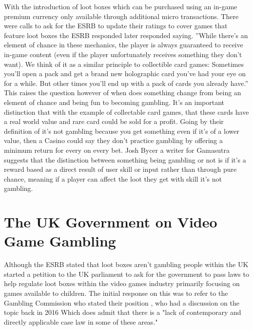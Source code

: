 \documentclass{scrartcl}
\begin{document}
With the introduction of loot boxes which can be purchased using an in-game premium currency only available through additional micro transactions. There were calls to ask for the ESRB to update their ratings to cover games that feature loot boxes the ESRB responded later responded saying. ''While there’s an element of chance in these mechanics, the player is always guaranteed to receive in-game content (even if the player unfortunately receives something they don’t want). We think of it as a similar principle to collectible card games: Sometimes you’ll open a pack and get a brand new holographic card you’ve had your eye on for a while. But other times you’ll end up with a pack of cards you already have.'' \cite{Jason2017ESRB} This raises the question however of when does something change from being an element of chance and being fun to becoming gambling. It's an important distinction that with the example of collectable card games, that these cards have a real world value and rare card could be sold for a profit. Going by their definition of it's not gambling because you get something even if it's of a lower value, then a Casino could say they don't practice gambling by offering a minimum return for every on every bet. Josh Bycer a writer for Gamasutra \cite{Josh2017Loot} suggests that the distinction between something being gambling or not is if it's a reward based as a direct result of user skill or input rather than through pure chance, meaning if a player can affect the loot they get with skill it's not gambling.

\section{The UK Government on Video Game Gambling}
Although the ESRB stated that loot boxes aren't gambling people within the UK started a petition to the UK parliament to ask for the government to pass laws to help regulate loot boxes within the video games industry primarily focusing on games available to children. The initial response on this was to refer to the Gambling Commission who stated their position \cite{GamCom2017position}, who had a discussion on the topic back in 2016 \cite{GamCom2016discussion} Which does admit that there is a "lack of contemporary and directly applicable case law in some of these areas." 
\end{document}
